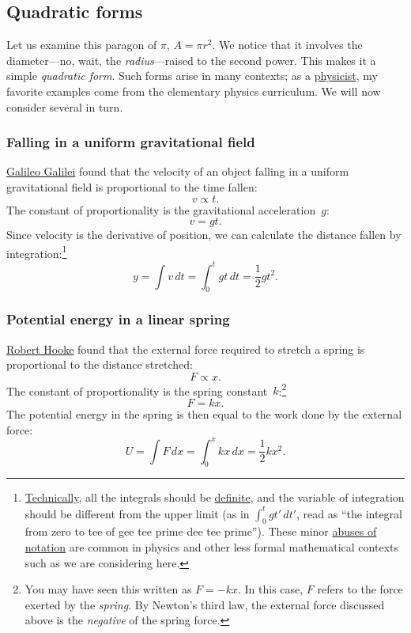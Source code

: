 {  \subsection{Quadratic forms} %
  \label{sec:quadratic_forms}

Let us examine this paragon of $\pi$, $A = \pi r^2$. We notice that it involves the diameter---no, wait, the \emph{radius}---raised to the second power. This makes it a simple \emph{quadratic form}. Such forms arise in many contexts; as a \href{https://thesis.library.caltech.edu/1940/}{physicist}, my favorite examples come from the elementary physics curriculum. We will now consider several in turn.

    \subsubsection{Falling in a uniform gravitational field} %
    \label{sec:falling_in_a_uniform_gravitational_field}

\href{https://en.wikipedia.org/wiki/Galileo_Galilei}{Galileo Galilei} found that the velocity of an object falling in a uniform gravitational field is proportional to the time fallen:
\[ v \propto t. \]
The constant of proportionality is the gravitational acceleration~$g$:
\[ v = g t. \]
Since velocity is the derivative of position, we can calculate the distance fallen by integration:\footnote{\href{https://xkcd.com/1475/}{Technically}, all the integrals should be \href{https://mathworld.wolfram.com/DefiniteIntegral.html}{definite}, and the variable of integration should be different from the upper limit (as in $\int_0^t gt'\,dt'$, read as ``the integral from zero to tee of gee tee prime dee tee prime''). These minor \href{https://en.wikipedia.org/wiki/Abuse_of_notation}{abuses of notation} are common in physics and other less formal mathematical contexts such as we are considering here.}
\[ y = \int v\,dt = \int_0^t gt\,dt = \textstyle{\frac{1}{2}} gt^2. \]


    \subsubsection{Potential energy in a linear spring} %
    \label{sec:potential_energy_in_a_linear_spring}

\href{https://en.wikipedia.org/wiki/Robert_Hooke}{Robert Hooke} found that the external force required to stretch a spring is proportional to the distance stretched:
\[ F \propto x. \]
The constant of proportionality is the spring constant~$k$:\footnote{You may have seen this written as $F = -kx$. In this case, $F$ refers to the force exerted by the \emph{spring}. By Newton's third law, the external force discussed above is the \emph{negative} of the spring force.}
\[ F = k x. \]
The potential energy in the spring is then equal to the work done by the external force:
\[ U = \int F\,dx = \int_0^x kx\,dx = \textstyle{\frac{1}{2}} kx^2. \]

}

